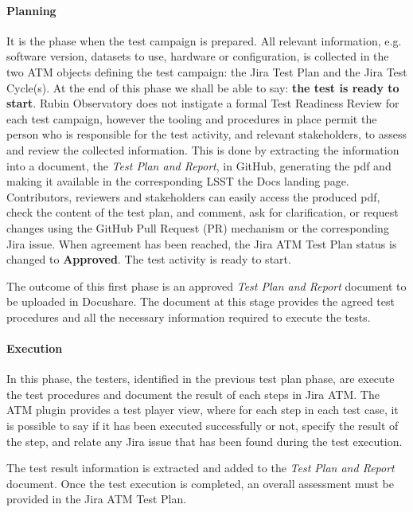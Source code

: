 \paragraph{Planning}
It is the phase when the test campaign is prepared. All relevant information, e.g. software version, datasets to use, 
hardware or configuration, is  collected in the two ATM objects defining the test campaign:  the Jira Test Plan and the Jira Test Cycle(s).
At the end of this phase we shall be able to say: \textbf{the test is ready to start}.
Rubin Observatory does not instigate a formal Test Readiness Review for each test campaign,
however the tooling and procedures in place permit the person who is responsible for the test activity, and relevant stakeholders, to assess and review the collected information.
This is done by extracting the information into a document, the \textit{Test Plan and Report}, in GitHub, generating the pdf and making it available
in the corresponding LSST the Docs landing page. Contributors, reviewers and stakeholders can easily access the produced pdf,
check the content of the test plan, and comment, ask for clarification, or request changes using the GitHub
Pull Request (PR) mechanism or the corresponding Jira issue.
When agreement has been reached, the Jira ATM Test Plan status is changed to \textbf{Approved}. The test activity is ready to start.

The outcome of this first phase is an approved \textit{Test Plan and Report} document to be uploaded in Docushare.
The document at this stage provides the agreed test procedures and all the necessary information required to execute the tests.

\paragraph{Execution}
In this phase, the testers, identified in the previous test plan phase, are  execute the test procedures and
document the result of each steps in Jira ATM.
The ATM plugin provides a test player view, where for each step in each test case, it is possible to say if it has been executed successfully or not,
specify the result of the step, and relate any Jira issue that has been found during the test execution.

The test result information is extracted and added to the \textit{Test Plan and Report} document.
Once the test execution is completed, an overall assessment must  be provided in the Jira ATM Test Plan.

